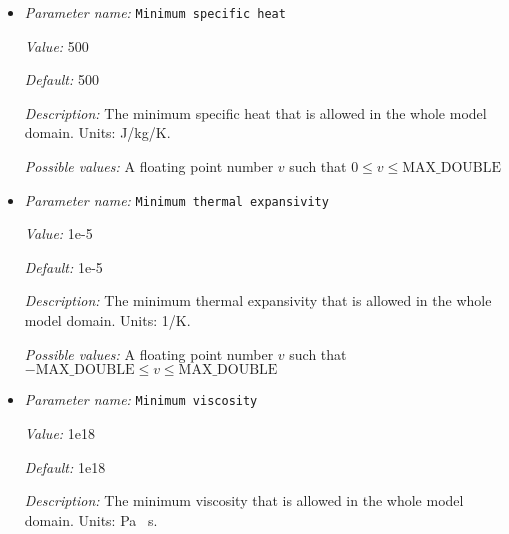 \begin{itemize}
{\it Default:} 1e-5


{\it Description:} The minimum grain size that is used for the material model. This parameter is introduced to limit local viscosity contrasts, but still allows for a widely varying viscosity over the whole mantle range. Units: m.


{\it Possible values:} A floating point number $v$ such that $0 \leq v \leq \text{MAX\_DOUBLE}$
\item {\it Parameter name:} {\tt Minimum specific heat}
\label{parameters:Material model/Grain size model/Minimum specific heat}
\label{parameters:Material_20model/Grain_20size_20model/Minimum_20specific_20heat}


{\it Value:} 500


{\it Default:} 500


{\it Description:} The minimum specific heat that is allowed in the whole model domain. Units: J/kg/K.


{\it Possible values:} A floating point number $v$ such that $0 \leq v \leq \text{MAX\_DOUBLE}$
\item {\it Parameter name:} {\tt Minimum thermal expansivity}
\label{parameters:Material model/Grain size model/Minimum thermal expansivity}
\label{parameters:Material_20model/Grain_20size_20model/Minimum_20thermal_20expansivity}


{\it Value:} 1e-5


{\it Default:} 1e-5


{\it Description:} The minimum thermal expansivity that is allowed in the whole model domain. Units: 1/K.


{\it Possible values:} A floating point number $v$ such that $-\text{MAX\_DOUBLE} \leq v \leq \text{MAX\_DOUBLE}$
\item {\it Parameter name:} {\tt Minimum viscosity}
\label{parameters:Material model/Grain size model/Minimum viscosity}
\label{parameters:Material_20model/Grain_20size_20model/Minimum_20viscosity}


{\it Value:} 1e18


{\it Default:} 1e18


{\it Description:} The minimum viscosity that is allowed in the whole model domain. Units: Pa \, s.



\end{itemize}
